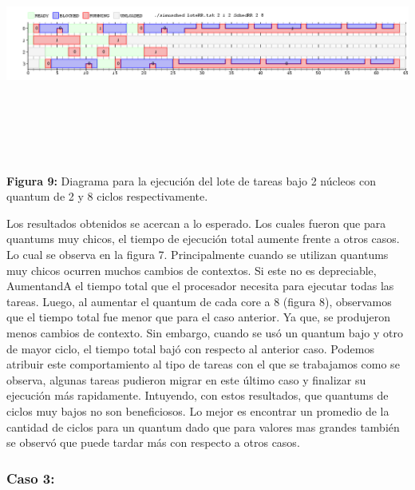 \documentclass[a4paper]{article}
\begin{document}
 \includegraphics[width=\textwidth,height=3.0in,keepaspectratio]{imagenes/ej4/eje3.png} \\
\begin {flushleft}
\textbf{Figura 9:} Diagrama para la ejecuci\'on del lote de tareas bajo 2 n\'ucleos con quantum de 2 y 8 ciclos respectivamente.
\end{flushleft}

\bigskip

Los resultados obtenidos se acercan a lo esperado. Los cuales fueron que para quantums muy chicos, el tiempo de ejecución total aumente frente a otros casos. Lo cual se observa en la figura 7. Principalmente cuando se utilizan quantums muy chicos ocurren muchos cambios de contextos. Si este no es depreciable, AumentandA el tiempo total que el procesador necesita para ejecutar todas las tareas. Luego, al aumentar el quantum de cada core a 8 (figura 8), observamos que el tiempo total fue menor que para el caso anterior. Ya que, se produjeron menos cambios de contexto. Sin embargo, cuando se usó un quantum bajo y otro de mayor ciclo, el tiempo total bajó con respecto al anterior caso. Podemos atribuir este comportamiento al tipo de tareas con el que se trabajamos como se observa, algunas tareas pudieron migrar en este último caso y finalizar su ejecución más rapidamente. Intuyendo, con estos resultados, que quantums de ciclos muy bajos no son beneficiosos. Lo mejor es encontrar un promedio de la cantidad de ciclos para un quantum dado que para valores mas grandes también se observó que puede tardar más con respecto a otros casos.   
 
 
 \subsubsection{Caso 3:}
 
\end{document}

